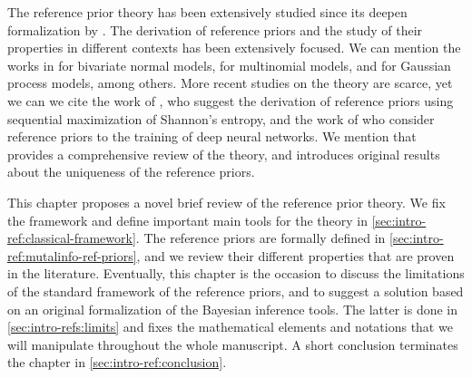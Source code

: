 The reference prior theory has been extensively studied since its deepen formalization by \citet{berger_formal_2009}. 
{The derivation of reference priors and the study of their properties in different contexts has been extensively focused. We can mention the works in \cite{berger_objective_2008} for bivariate normal models, 
 \cite{berger_ordered_1992} for multinomial models,  and \cite{gu_parallel_2016} for Gaussian process models, among others. 
More recent studies on the theory are scarce, yet we can
we cite the work of \citet{bodnar_analytical_2014}, who suggest the derivation of reference priors using sequential maximization of Shannon's entropy, and the work of \citet{gao_deep_2022} 
who consider reference priors to the training of deep neural networks. 
We mention that \citet{mure_objective_2018} provides a comprehensive review of the theory, and introduces original results about the uniqueness of the reference priors.}

This chapter proposes a novel brief review of the reference prior theory. We fix the framework and define important main tools for the theory in \cref{sec:intro-ref:classical-framework}. %
The reference priors are formally defined in \cref{sec:intro-ref:mutalinfo-ref-priors}, and we review their different properties that are proven in the literature.
Eventually, this chapter is the occasion to discuss the limitations of the standard framework of the reference priors, and to suggest a solution based on an original formalization of the Bayesian inference tools.  The latter is done in \cref{sec:intro-refs:limits} and fixes the mathematical elements and notations that we will manipulate throughout the  whole manuscript. A short conclusion terminates the chapter in \cref{sec:intro-ref:conclusion}.









